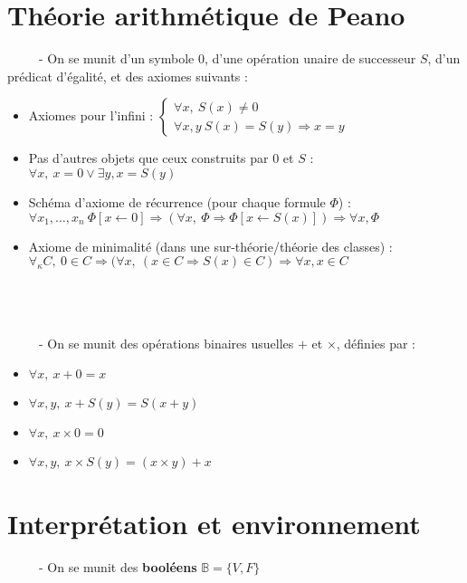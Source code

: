 \documentclass[11pt,a4paper]{article}
\begin{document}
\section{Théorie arithmétique de Peano}

\ \ \ \ \ - On se munit d'un symbole $0$, d'une opération unaire de successeur $S$, d'un prédicat d'égalité, et des axiomes suivants :
\begin{itemize}
\item Axiomes pour l'infini : $\begin{cases} \forall x, \ S(x) \neq 0 \\ \forall x,y \ S(x)=S(y) \Rightarrow x=y \end{cases}$
\item Pas d'autres objets que ceux construits par 0 et $S$ : $ \forall x, \ x=0 \lor \exists y,  x=S(y)$
\item Schéma d'axiome de récurrence (pour chaque formule $\Phi$) : \\
$ \forall x_1,\dots,x_n \ \Phi[x\leftarrow 0] \Rightarrow ( \forall x, \ \Phi \Rightarrow \Phi[x\leftarrow S(x)]) \Rightarrow \forall x, \Phi$
\item Axiome de minimalité (dans une sur-théorie/théorie des classes) : \\
$\forall_\kappa C, \ 0 \in C \Rightarrow ( \forall x, \ (x \in C \Rightarrow S(x) \in C) \Rightarrow \forall x, x \in C$
\\
\\
\\
\\
\end{itemize} 
\ \ \ \ \ - On se munit des opérations binaires usuelles $+$ et $\times$, définies par :
\begin{itemize}
\item $\forall x, \ x + 0 = x$
\item $\forall x,y, \ x+S(y)=S(x+y)$
\item $\forall x, \ x \times 0 = 0$
\item $\forall x,y, \ x\times S(y)=(x \times y)+ x$

\end{itemize}  


\section{Interprétation et environnement}

\ \ \ \ \ - On se munit des \textbf{booléens} $\mathbb{B} = \{V, F \}$ \\
\end{document}
